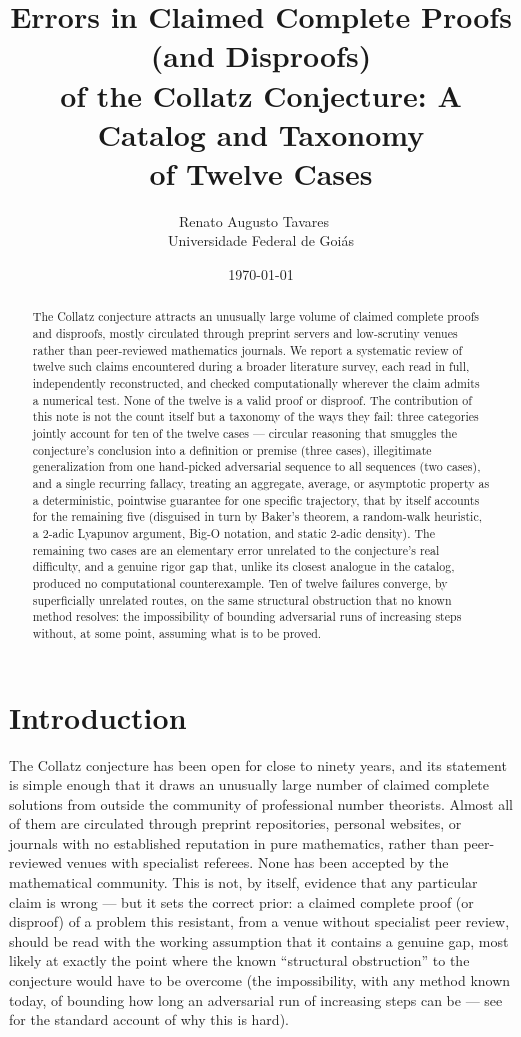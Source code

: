 \documentclass[11pt]{article}
\title{Errors in Claimed Complete Proofs (and Disproofs)\\
of the Collatz Conjecture: A Catalog and Taxonomy\\
of Twelve Cases}
\author{Renato Augusto Tavares~{\small\href{mailto:dr.renatotavares@gmail.com}{\textcolor{black}{\faEnvelope}}}~\orcidlink{0009-0002-0196-3311}\\
\normalsize Universidade Federal de Goiás}
\date{\today}
\begin{document}
\maketitle

\begin{abstract}
The Collatz conjecture attracts an unusually large volume of claimed
complete proofs and disproofs, mostly circulated through preprint
servers and low-scrutiny venues rather than peer-reviewed mathematics
journals. We report a systematic review of twelve such claims
encountered during a broader literature survey, each read in full,
independently reconstructed, and checked computationally wherever the
claim admits a numerical test. None of the twelve is a valid proof or
disproof. The contribution of this note is not the count itself but a
taxonomy of the ways they fail: three categories jointly account for
ten of the twelve cases --- circular reasoning that smuggles the
conjecture's conclusion into a definition or premise (three cases),
illegitimate generalization from one hand-picked adversarial sequence
to all sequences (two cases), and a single recurring fallacy, treating
an aggregate, average, or asymptotic property as a deterministic,
pointwise guarantee for one specific trajectory, that by itself
accounts for the remaining five (disguised in turn by Baker's theorem,
a random-walk heuristic, a 2-adic Lyapunov argument, Big-O notation,
and static 2-adic density). The remaining two cases are an elementary error
unrelated to the conjecture's real difficulty, and a genuine rigor gap
that, unlike its closest analogue in the catalog, produced no
computational counterexample. Ten of twelve failures converge, by
superficially unrelated routes, on the same structural obstruction that
no known method resolves: the impossibility of bounding adversarial
runs of increasing steps without, at some point, assuming what is to be
proved.
\end{abstract}

\section{Introduction}
\label{sec:intro}

The Collatz conjecture has been open for close to ninety years, and
its statement is simple enough that it draws an unusually large number
of claimed complete solutions from outside the community of
professional number theorists. Almost all of them are circulated
through preprint repositories, personal websites, or journals with no
established reputation in pure mathematics, rather than peer-reviewed
venues with specialist referees. None has been accepted by the
mathematical community. This is not, by itself, evidence that any
particular claim is wrong --- but it sets the correct prior: a claimed
complete proof (or disproof) of a problem this resistant, from a venue
without specialist peer review, should be read with the working
assumption that it contains a genuine gap, most likely at exactly the
point where the known ``structural obstruction'' to the conjecture
would have to be overcome (the impossibility, with any method known
today, of bounding how long an adversarial run of increasing steps can
be --- see \cite{LagariasSurvey} for the standard account of why this
is hard).
\end{document}
